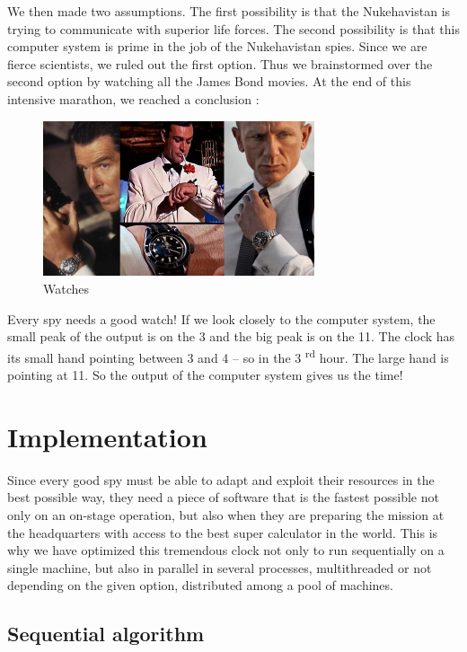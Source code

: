 \documentclass[11pt,a4paper]{article}
\begin{document}
We then made two assumptions. The first possibility is that the Nukehavistan is trying to communicate with superior life forces. The second possibility is that this computer system is prime in the job of the Nukehavistan spies. Since we are fierce scientists, we ruled out the first option. Thus we brainstormed over the second option by watching all the James Bond movies. At the end of this intensive marathon, we reached a conclusion :

\begin{figure}[!h]
\centering
\includegraphics[width=8cm]{watches.png}
\caption{Watches}
\label{reverse}
\end{figure}

Every spy needs a good watch! If we look closely to the computer system, the small peak of the output is on the 3 and the big peak is on the 11. The clock has its small hand pointing between 3 and 4 -- so in the 3 \textsuperscript{rd} hour. The large hand is pointing at 11. So the output of the computer system gives us the time!

\section{Implementation}

Since every good spy must be able to adapt and exploit their resources in the best possible way, they need a piece of software that is the fastest possible not only on an on-stage operation, but also when they are preparing the mission at the headquarters with access to the best super calculator in the world. This is why we have optimized this tremendous clock not only to run sequentially on a single machine, but also in parallel in several processes, multithreaded or not depending on the given option, distributed among a pool of machines.

\subsection{Sequential algorithm}
\end{document}
